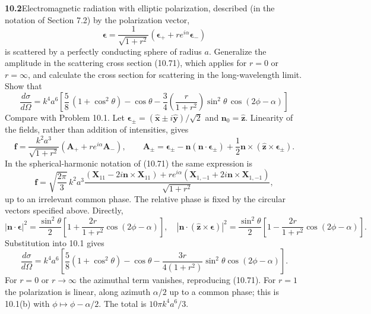 \par\bigskip
\noindent\textbf{10.2}\quad Electromagnetic radiation with elliptic polarization, described (in the notation of Section 7.2) by the polarization vector,
\[
\boldsymbol{\epsilon}=\frac{1}{\sqrt{1+r^{2}}}\left(\boldsymbol{\epsilon}_{+}+re^{i\alpha}\boldsymbol{\epsilon}_{-}\right)
\]
is scattered by a perfectly conducting sphere of radius $a$. Generalize the amplitude in the scattering cross section (10.71), which applies for $r=0$ or $r=\infty$, and calculate the cross section for scattering in the long-wavelength limit. Show that
\[
\frac{d\sigma}{d\Omega}=k^{4}a^{6}\left[\frac{5}{8}\,(1+\cos^{2}\theta)-\cos\theta-\frac{3}{4}\left(\frac{r}{1+r^{2}}\right)\sin^{2}\theta\,\cos(2\phi-\alpha)\right]
\]
Compare with Problem 10.1.
\solution
Let $\boldsymbol\epsilon_\pm=(\widehat{\mathbf x}\pm
i\widehat{\mathbf y})/\sqrt2$ and $\mathbf n_0=\widehat{\mathbf z}$.
Linearity of the fields, rather than addition of intensities, gives
\[
\mathbf f=\frac{k^2a^3}{\sqrt{1+r^2}}
(\mathbf A_++re^{i\alpha}\mathbf A_-),\qquad
\mathbf A_\pm=\boldsymbol\epsilon_\pm
-\mathbf n(\mathbf n\cdot\boldsymbol\epsilon_\pm)
+\frac12\mathbf n\times(\widehat{\mathbf z}\times\boldsymbol\epsilon_\pm).
\]
In the spherical-harmonic notation of (10.71) the same expression is
\[
\mathbf f=\sqrt{\frac{2\pi}{3}}\,k^2a^3
\frac{(\mathbf X_{11}-2i\mathbf n\times\mathbf X_{11})
+re^{i\alpha}(\mathbf X_{1,-1}+2i\mathbf n\times\mathbf X_{1,-1})}
{\sqrt{1+r^2}},
\]
up to an irrelevant common phase. The relative phase is fixed by the
circular vectors specified above. Directly,
\[
|\mathbf n\cdot\boldsymbol\epsilon|^2
=\frac{\sin^2\theta}{2}
\left[1+\frac{2r}{1+r^2}\cos(2\phi-\alpha)\right],
\quad
|\mathbf n\cdot(\widehat{\mathbf z}\times\boldsymbol\epsilon)|^2
=\frac{\sin^2\theta}{2}
\left[1-\frac{2r}{1+r^2}\cos(2\phi-\alpha)\right].
\]
Substitution into 10.1 gives
\[
\boxed{\frac{d\sigma}{d\Omega}=k^4a^6
\left[\frac58(1+\cos^2\theta)-\cos\theta
-\frac{3r}{4(1+r^2)}\sin^2\theta\cos(2\phi-\alpha)\right].}
\]
For $r=0$ or $r\to\infty$ the azimuthal term vanishes, reproducing
(10.71). For $r=1$ the polarization is linear, along azimuth
$\alpha/2$ up to a common phase; this is 10.1(b) with
$\phi\mapsto\phi-\alpha/2$. The total is $10\pi k^4a^6/3$.

